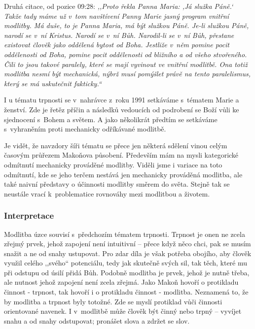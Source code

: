 \begin{enumerate}
{    Druhá citace, od pozice 09:28: \textit{%
      ,,Proto řekla Panna Maria: ,Já služka Páně.` Takže tady máme už v~tom
      navštívení Panny Marie jasný program vnitřní modlitby. Má duše, to je
      Panna Maria, má být služkou Páně. Je-li služkou Páně, narodí se v~ní
      Kristus. Narodí se v~ní Bůh. Narodil-li se v~ní Bůh, přestane existovat
      člověk jako oddělená bytost od Boha. Jestliže v~něm pomine pocit
      oddělenosti od Boha, pomine pocit oddělenosti od bližního a od všeho
      stvořeného. Čili to jsou takové paralely, které se mají vyvinout ve
      vnitřní modlitbě. Ona totiž modlitba nesmí být mechanická, nýbrž musí
      pomýšlet právě na tento paralelismus, který se má uskutečnit fakticky.``
    }

    I u tématu trpnosti se v~nahrávce z~roku 1991 setkáváme s~tématem Marie a
    ženství. Zde je řetěz příčin a následků vedoucích od podrobení se Boží vůli
    ke sjednocení s~Bohem a světem. A jako několikrát předtím se setkáváme
    s~vyhraněním proti mechanicky odříkávané modlitbě.
  }
\end{enumerate}

Je vidět, že navzdory šíři tématu se přece jen některá sdělení vinou celým
časovým průřezem Makoňova působení. Především mám na mysli kategorické odmítnutí
mechanicky prováděné modlitby. Viděli jsme i variace na toto odmítnutí, kde se
jeho terčem nestává jen mechanicky prováděná modlitba, ale také naivní představy
o účinnosti modlitby směrem do světa. Stejně tak se neustále vrací k~problematice
rovnováhy mezi modlitbou a životem.

\subsubsection*{Interpretace}

Modlitba úzce souvisí s~předchozím tématem trpnosti. Trpnost je onen ne zcela
zřejmý prvek, jehož zapojení není intuitivní -- přece když něco chci, pak se
musím snažit a ne od snahy ustupovat. Pro zdar díla je však potřeba obojího, aby
člověk využil celého ,,svého`` potenciálu, tedy jak skutečně svých sil, tak
těch, které mu při odstupu od úsilí přidá Bůh. Podobně modlitba je prvek, jehož
je nutně třeba, ale nutnost jehož zapojení není zcela zřejmá. Jako Makoň hovoří
o protikladu činnost - trpnost, tak hovoří i o protikladu činnost - modlitba.
Neznamená to, že by modlitba a trpnost byly totožné. Zde se myslí protiklad vůči
činnosti orientované navenek. I v~modlitbě může člověk být činný nebo trpný --
vyvíjet snahu a od snahy odstupovat; pronášet slova a zdržet se slov.

